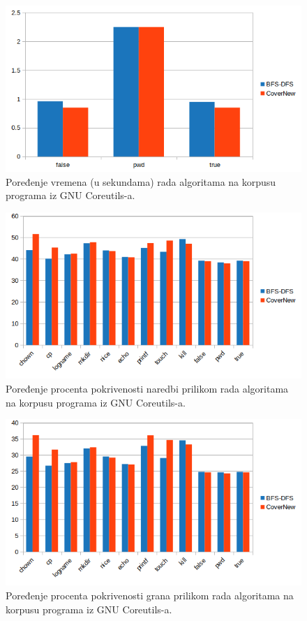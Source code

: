 \documentclass[12pt,oneside]{memoir}
\begin{document}
\begin{figure}[H]
    \centering
    \includegraphics[width=1.0\linewidth]{poredjenje_vremena_2.png}
    \caption{Poređenje vremena (u sekundama) rada algoritama na korpusu programa iz GNU Coreutils-a.}
    \label{fig:poredjenje_vemena_2}
\end{figure}

\begin{figure}[H]
    \centering
    \includegraphics[width=1.0\linewidth]{poredjenje_instrukcije.png}
    \caption{Poređenje procenta pokrivenosti naredbi prilikom rada algoritama na korpusu programa iz GNU Coreutils-a.}
    \label{fig:poredjenje_instrukcija}
\end{figure}

\begin{figure}[H]
    \centering
    \includegraphics[width=1.0\linewidth]{poredjenje_grananja.png}
    \caption{Poređenje procenta pokrivenosti grana prilikom rada algoritama na korpusu programa iz GNU Coreutils-a.}
    \label{fig:poredjenje_grana}
\end{figure}
\end{document}
